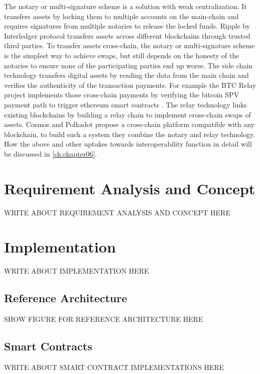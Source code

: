 The notary or multi-signature scheme is a solution with weak centralization. It transfers assets by locking them to multiple accounts on the main-chain and requires signatures from multiple notaries to release the locked funds. Ripple by Interledger protocol \cite{hope2016interledger} transfers assets across different blockchains through trusted third parties. To transfer assets cross-chain, the notary or multi-signature scheme is the simplest way to achieve swaps, but still depends on the honesty of the notaries to ensure none of the participating parties end up worse. The side chain technology transfers digital assets by reading the data from the main chain and verifies the authenticity of the transaction payments. For example the BTC Relay  project implements those cross-chain payments by verifying the bitcoin \ac{SPV} payment path to trigger ethereum smart contracts \cite{buterin2014ethereum}. The relay technology links existing blockchains by building a relay chain to implement cross-chain swaps of assets. Cosmos \cite{kwon2018network} and Polkadot \cite{wood2016polkadot} propose a cross-chain platform compatible with any blockchain, to build such a system they combine the notary and relay technology. How the above and other uptakes towards interoperability function in detail will be discussed in \autoref{ch:chapter06}.


\chapter{Requirement Analysis and Concept}
\label{ch:chapter04}
WRITE ABOUT REQUIREMENT ANALYSIS AND CONCEPT HERE

\chapter{Implementation}
\label{ch:chapter05}
WRITE ABOUT IMPLEMENTATION HERE

\section{Reference Architecture}
\label{sec:chapter05:ref_architecture}

SHOW FIGURE FOR REFERENCE ARCHITECTURE HERE
%
%
\section{Smart Contracts}
\label{sec:chapter05:smartcontracts}
WRITE ABOUT SMART CONTRACT IMPLEMENTATIONS HERE

